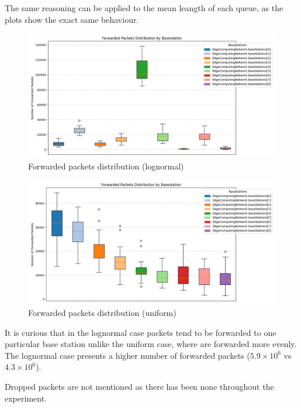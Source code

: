 \documentclass{report}
\begin{document}
\begin{flushleft}
The same reasoning can be applied to the mean leangth of each queue, as the plots show the exact same behaviour.
\end{flushleft}

\begin{figure}[H]
    \centering
    \includegraphics[width=\textwidth]{img/plots/log_1e3_B/forwarded.png}
    \caption{Forwarded packets distribution (lognormal)}
\end{figure}

\begin{figure}[H]
    \centering
    \includegraphics[width=\textwidth]{img/plots/uni_1e3_B/forwarded.png}
    \caption{Forwarded packets distribution (uniform)}
\end{figure}

\begin{flushleft}
It is curious that in the lognormal case packets tend to be forwarded to one particular base station unlike the uniform case, where are forwarded more evenly. The lognormal case presents a higher number of forwarded packets ($5.9\times10^6$ vs $4.3\times10^6$).
\vspace{1em}

Dropped packets are not mentioned as there has been none throughout the experiment.
\end{flushleft}
\end{document}
